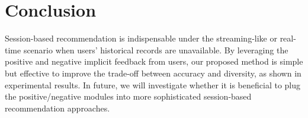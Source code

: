 \section{Conclusion}

Session-based recommendation is indispensable under the streaming-like or real-time scenario when users' historical records are unavailable. 
By leveraging the positive and negative implicit feedback from users, 
our proposed method is simple but effective to improve the trade-off between accuracy and diversity, 
as shown in experimental results. In future, we will investigate whether it is beneficial to
plug the positive/negative modules into more sophisticated session-based recommendation approaches.
